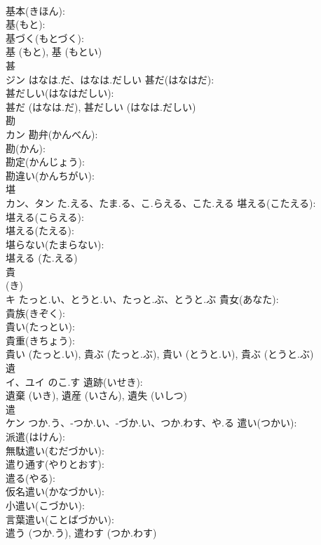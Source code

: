 \documentclass[8pt]{extreport}
\begin{document}
\begin{CJK}{UTF8}{min}
\\	基本(きほん): 
\\	基(もと): 
\\	基づく(もとづく): 
\\	基 (もと), 基 (もとい)
\\	甚			
\\	ジン	はなは.だ、はなは.だしい	甚だ(はなはだ): 
\\	甚だしい(はなはだしい): 
\\	甚だ (はなは.だ), 甚だしい (はなは.だしい)
\\	勘			
\\	カン		勘弁(かんべん): 
\\	勘(かん): 
\\	勘定(かんじょう): 
\\	勘違い(かんちがい): 
\\	堪			
\\	カン、タン	た.える、たま.る、こ.らえる、こた.える	堪える(こたえる): 
\\	堪える(こらえる): 
\\	堪える(たえる): 
\\	堪らない(たまらない): 
\\	堪える (た.える)
\\	貴			
\\	(き) 
\\	キ	たっと.い、とうと.い、たっと.ぶ、とうと.ぶ	貴女(あなた): 
\\	貴族(きぞく): 
\\	貴い(たっとい): 
\\	貴重(きちょう): 
\\	貴い (たっと.い), 貴ぶ (たっと.ぶ), 貴い (とうと.い), 貴ぶ (とうと.ぶ)
\\	遺			
\\	イ、ユイ	のこ.す	遺跡(いせき): 
\\	遺棄 (いき), 遺産 (いさん), 遺失 (いしつ)
\\	遣			
\\	ケン	つか.う、-つか.い、-づか.い、つか.わす、や.る	遣い(つかい): 
\\	派遣(はけん): 
\\	無駄遣い(むだづかい): 
\\	遣り通す(やりとおす): 
\\	遣る(やる): 
\\	仮名遣い(かなづかい): 
\\	小遣い(こづかい): 
\\	言葉遣い(ことばづかい): 
\\	遣う (つか.う), 遣わす (つか.わす)

\end{CJK}
\end{document}
